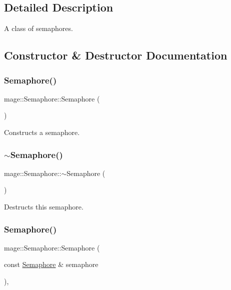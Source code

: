 \subsection{Detailed Description}
A class of semaphores. 

\subsection{Constructor \& Destructor Documentation}
\hypertarget{classmage_1_1_semaphore_a7b4f53c18b9a244ed98ef58fa5cfa2bb}{}\label{classmage_1_1_semaphore_a7b4f53c18b9a244ed98ef58fa5cfa2bb} 
\subsubsection{\texorpdfstring{Semaphore()}{Semaphore()}\hspace{0.1cm}{\footnotesize\ttfamily [1/2]}}
{\footnotesize\ttfamily mage\+::\+Semaphore\+::\+Semaphore (\begin{DoxyParamCaption}{ }\end{DoxyParamCaption})}

Constructs a semaphore. \hypertarget{classmage_1_1_semaphore_a991ed365c28e4a9c63ff34a5efeb012d}{}\label{classmage_1_1_semaphore_a991ed365c28e4a9c63ff34a5efeb012d} 
\subsubsection{\texorpdfstring{$\sim$\+Semaphore()}{~Semaphore()}}
{\footnotesize\ttfamily mage\+::\+Semaphore\+::$\sim$\+Semaphore (\begin{DoxyParamCaption}{ }\end{DoxyParamCaption})}

Destructs this semaphore. \hypertarget{classmage_1_1_semaphore_a8873b2ed82ff66d323a8c3cebf0fb5c0}{}\label{classmage_1_1_semaphore_a8873b2ed82ff66d323a8c3cebf0fb5c0} 
\subsubsection{\texorpdfstring{Semaphore()}{Semaphore()}\hspace{0.1cm}{\footnotesize\ttfamily [2/2]}}
{\footnotesize\ttfamily mage\+::\+Semaphore\+::\+Semaphore (\begin{DoxyParamCaption}\item[{const \hyperlink{classmage_1_1_semaphore}{Semaphore} \&}]{semaphore }\end{DoxyParamCaption})\hspace{0.3cm}{\ttfamily [private]}, {\ttfamily [delete]}}

